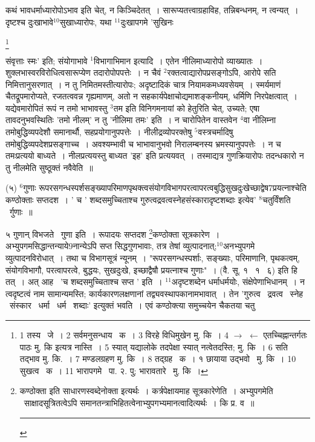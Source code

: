 \documentclass[11pt, openany]{book}
\newcommand\blfootnote[1]{%
 \begingroup
 \renewcommand\thefootnote{}\footnote{#1}%
 \addtocounter{footnote}{-1}%
 \endgroup
}
\begin{document}
कथं भावधर्माध्यारोपोऽभाव इति चेत्, न किञ्चिदेतत्~। सारूप्यतत्त्वाग्रहाविह, तन्निबन्धनम्, न त्वन्यत्~। दृष्टश्च दुःखाभावे${}^10$सुखाध्यारोपः, यथा ${}^11$दुःखापगमे 'सुखिनः

\blfootnote{1 तस्य  \textendash\ जे~। 2 सर्वमनुसन्धाय  \textendash\ क~। 3 विरहे विधिमुखेन मु. कि~। 4 $\rightarrow$ $\leftarrow$ एतच्चिह्नान्तर्गतः पाठः मु. कि इत्यत्र नास्ति~। 5 स्यात् यद्यालोके तदपेक्षा स्यात् नत्वेतदस्ति; मु. कि~। 6 सति तद्भाव मु. कि.~। 7 मण्डलग्रहण मु. कि~। 8 तद्ग्रह  \textendash\ क~। १ छायाया उद्भवो  \textendash\ मु. कि~। 10 सुखत्व  \textendash\ क~। 11 भारापगमे  \textendash\ पा. २. पु; भारावतारे  \textendash\ मु. कि~।}

\newpage
\begin{sloppypar}
\noindent
संवृत्ताः स्मः' इति; संयोगाभावे ${}^1$विभागाभिमान इत्यादि~। एतेन नीलिमाध्यारोपो व्याख्यातः~। शुक्लभास्वरविरोधित्वसारूप्येण तदारोपोपपत्तेः~। न चैवं ${}^2$रक्तत्वाद्यारोपप्रसङ्गोऽपि, आरोपे सति निमित्तानुसरणात्~। न तु निमितमस्तीत्यारोपः; अदृष्टादिकं चात्र नियामकमध्यवसेयम्~। स्मर्यमाणं चैतद्रूपमारोप्यते, रजतत्ववन्न गृह्यमाणम्, अतो न सहकार्यपेक्षाचोद्यमाशङ्कनीयम्, धर्मिणि निरपेक्षत्वात्~। यद्येवमारोपितं रूपं न तमो भाभावस्तु ${}^3$तम इति विनिगमनायां को हेतुरिति चेत्, उच्यते; एषा तावदनुभवस्थितिः 'तमो नीलम्' न तु 'नीलिमा तमः' इति~। न चारोपितेन वास्तवेन ${}^4$वा नीलिम्ना तमोबुद्धिव्यपदेशौ समानार्थौ, सहप्रयोगानुपपत्तेः~। नीलीद्रव्योपरक्तेषु ${}^5$वस्त्रचर्मादिषु तमोबुद्धिव्यपदेशप्रसङ्गाच्च~। अवश्यम्भावी च भाभावानुभवो निरालम्बनस्य भ्रमस्यानुपपत्तेः~। न च तमःप्रत्ययो बाध्यते~। नीलप्रत्ययस्तु बाध्यत 'इह' इति प्रत्ययवत्~। तस्माद्यत्र गुणक्रियारोपः तदन्धकारो न तु नीलमेति सुष्ठूक्तं नवैवेति~॥
\end{sloppypar}

\hangindent=2cm {\knu (५) ${}^6$गुणाः रूपरसगन्धस्पर्शसङ्ख्यापरिमाणपृथक्त्वसंयोगविभागपरत्वापरत्वबुद्धिसुखदुःखेच्छाद्वेष7प्रयत्नाश्चेति कण्ठोक्ताः सप्तदश~। ' च ' शब्दसमुच्चिताश्च गुरुत्वद्रवत्वस्नेहसंस्कारादृष्टशब्दाः इत्येव' ${}^8$चतुर्विंशति \textendash\ र्गुणाः~॥}

५ गुणान् विभजते \textendash\ गुणा इति~। रूपादयः सप्तदश \renewcommand{\thefootnote}{१}\footnote{कण्ठोक्ता इति साधारणस्वब्देनोक्ता इत्यर्थः~। कर्त्रपेक्षायमाह सूत्रकारेणेति~। अभ्युपगमेति \textendash\ साक्षादसूत्रितत्वेऽपि समानतन्त्राभिहितत्वेनाभ्युपगभ्यमानत्वादित्यर्थः~। कि प्र. व~॥ \rule{0.4\linewidth}{0.5pt}}कण्ठोक्ता सूत्रकारेण~। अभ्युपगमसिद्धान्तन्याये9नान्येऽपि सप्त सिद्धगुणभावाः, तत्र तेषां व्युत्पादनात्;${}^10$अनभ्युपगमे व्युत्पादनविरोधात्~। तथा च विभागसूत्रं न्यूनम्~। "रूपरसगन्धस्पर्शाः, सङ्ख्याः, परिमाणानि, पृथकत्वम्, संयोगविभागौ, परत्वापरत्वे, बुद्धयः, सुखदुःखे, इच्छाद्वैषौ प्रयत्नाश्च गुणाः"~। (वै. सू. १ \textendash\ १ \textendash\ ६) इति हि तत्~। अत् आह \textendash\ 'च शब्दसमुच्चिताश्च सप्त ' इति~। ${}^11$अदृष्टशब्देन धर्माधर्मयोः, संक्षेपेणाभिधानम्~। न त्वदृष्टत्वं नाम सामान्यमस्ति; कार्यकारणलक्षणानां तद्व्यवस्थापकानामभावात्~। तेन 'गुरुत्व \textendash\ द्रवत्व \textendash\ स्नेह \textendash\ संस्कार \textendash\ धर्मा \textendash\ धर्म \textendash\ शब्दाः' इत्युक्तं भवति~। एवं कण्ठोक्त्या समुच्चयेन चैकतया चतु\textendash
\end{document}
